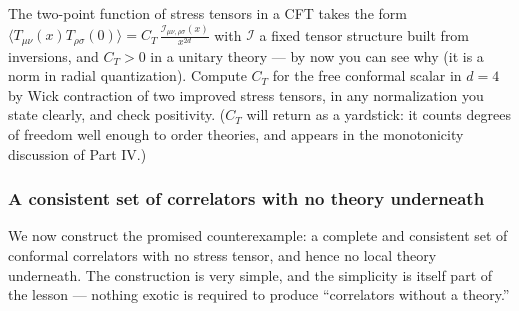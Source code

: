 \begin{exercise}[medium]
\label{exr:tt-positivity}
The two-point function of stress tensors in a CFT takes the form $\langle
T_{\mu\nu}(x) T_{\rho\sigma}(0)\rangle = C_T \,\frac{\mathcal{I}_{\mu\nu,
\rho\sigma}(x)}{x^{2d}}$ with $\mathcal{I}$ a fixed tensor structure built
from inversions, and $C_T > 0$ in a unitary theory --- by now you can see why
(it is a norm in radial quantization). Compute $C_T$ for the free conformal
scalar in $d = 4$ by Wick contraction of two improved stress tensors, in any
normalization you state clearly, and check positivity. ($C_T$ will return as
a yardstick: it counts degrees of freedom well enough to order theories, and
appears in the monotonicity discussion of Part IV.)
\end{exercise}

\subsubsection{A consistent set of correlators with no theory underneath}

We now construct the promised counterexample: a complete and consistent set
of conformal correlators with no stress tensor, and hence no local theory
underneath. The construction is very simple, and the simplicity is itself
part of the lesson --- nothing exotic is required to produce ``correlators
without a theory.''

